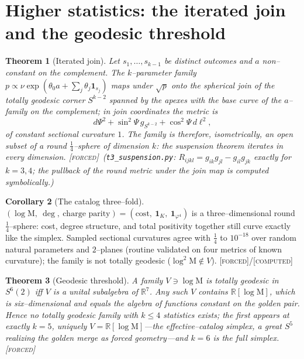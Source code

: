 \documentclass[11pt]{article}
\newtheorem{theorem}{Theorem}[section]
\theoremstyle{definition}
\newtheorem{corollary}[theorem]{Corollary}
\newcommand{\ph}{\varphi}
\newcommand{\R}{\mathbb{R}}
\newcommand{\Mah}{\mathrm{M}}
\newcommand{\forcedtag}{{\scshape [forced]}}
\newcommand{\computedtag}{{\scshape [computed]}}
\begin{document}
\section{Higher statistics: the iterated join and the geodesic threshold}\label{sec:join}
\begin{theorem}[Iterated join]\label{thm:join}
Let $s_1,\dots,s_{k-1}$ be distinct outcomes and $a$ non--constant on the complement. The
$k$--parameter family $p\propto\nu\exp(\theta_0a+\sum_j\theta_j\mathbf 1_{s_j})$ maps under
$\sqrt{p}$ onto the spherical join of the totally geodesic corner $S^{k-2}$ spanned by the apexes
with the base curve of the $a$--family on the complement; in join coordinates the metric is
\[
d\Psi^2+\sin^2\!\Psi\,g_{S^{k-2}}+\cos^2\!\Psi\,d\ell^2 ,
\]
of constant sectional curvature $1$. The family is therefore, isometrically, an open subset of a
round $\tfrac14$--sphere of dimension $k$: the suspension theorem iterates in every dimension.
\forcedtag\ (\texttt{t3\_suspension.py}: $R_{ijkl}=g_{ik}g_{jl}-g_{il}g_{jk}$ exactly for $k=3,4$;
the pullback of the round metric under the join map is computed symbolically.)
\end{theorem}

\begin{corollary}[The catalog three--fold]\label{cor:threefold}
$(\log\Mah,\ \deg,\ \text{charge parity})=(\mathrm{cost},\ \mathbf 1_K,\ \mathbf 1_{\ph^4})$ is a
three--dimensional round $\tfrac14$--sphere: cost, degree structure, and total positivity together
still curve exactly like the simplex. Sampled sectional curvatures agree with $\tfrac14$ to
$10^{-18}$ over random natural parameters and $2$--planes (routine validated on four metrics of known
curvature); the family is not totally geodesic ($\log^2\Mah\notin V$). \forcedtag/\computedtag
\end{corollary}

\begin{theorem}[Geodesic threshold]\label{thm:threshold}
A family $V\ni\log\Mah$ is totally geodesic in $S^6(2)$ iff $V$ is a unital subalgebra of $\R^7$.
Any such $V$ contains $\R[\log\Mah]$, which is six--dimensional and equals the algebra of functions
constant on the golden pair. Hence no totally geodesic family with $k\le4$ statistics exists; the
first appears at exactly $k=5$, uniquely $V=\R[\log\Mah]$---the \emph{effective--catalog simplex}, a
great $S^5$ realizing the golden merge as forced geometry---and $k=6$ is the full simplex.
\forcedtag
\end{theorem}
\end{document}
